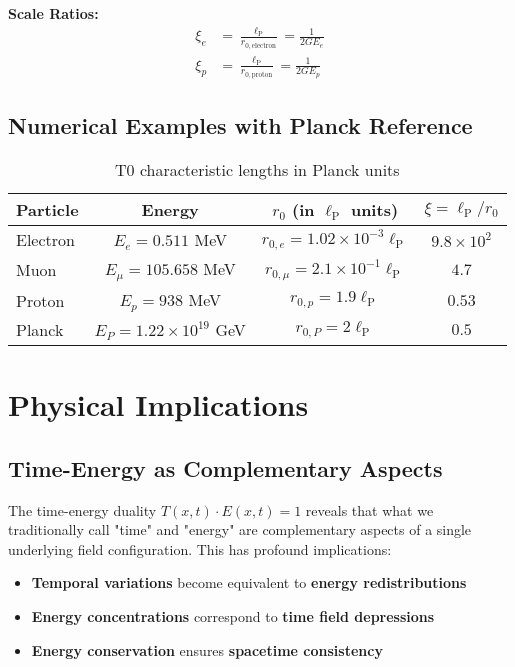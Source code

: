\documentclass[12pt,a4paper]{report}
\newcommand{\lP}{\ell_{\text{P}}}         %
\newcommand{\rzero}{r_0}                  %
\begin{document}
	\textbf{Scale Ratios:}
	\begin{align}
		\xi_{e} &= \frac{\lP}{r_{0,\text{electron}}} = \frac{1}{2GE_e} \\
		\xi_{p} &= \frac{\lP}{r_{0,\text{proton}}} = \frac{1}{2GE_p}
	\end{align}
	
	\subsection{Numerical Examples with Planck Reference}\label{subsec:numerical_examples}
	
	\begin{table}[htbp]
		\centering
		\begin{tabular}{lccc}
			\toprule
			\textbf{Particle} & \textbf{Energy} & \textbf{$\rzero$ (in $\lP$ units)} & \textbf{$\xi = \lP/\rzero$} \\
			\midrule
			Electron & $E_e = 0.511$ MeV & $r_{0,e} = 1.02 \times 10^{-3} \lP$ & $9.8 \times 10^{2}$ \\
			Muon & $E_\mu = 105.658$ MeV & $r_{0,\mu} = 2.1 \times 10^{-1} \lP$ & $4.7$ \\
			Proton & $E_p = 938$ MeV & $r_{0,p} = 1.9 \lP$ & $0.53$ \\
			Planck & $E_P = 1.22 \times 10^{19}$ GeV & $r_{0,P} = 2\lP$ & $0.5$ \\
			\bottomrule
		\end{tabular}
		\caption{T0 characteristic lengths in Planck units}
		\label{tab:t0_scales_planck}
	\end{table}
	
	\section{Physical Implications}\label{sec:physical_implications}
	
	\subsection{Time-Energy as Complementary Aspects}\label{subsec:complementary_aspects}
	
	The time-energy duality $T(x,t) \cdot E(x,t) = 1$ reveals that what we traditionally call "time" and "energy" are complementary aspects of a single underlying field configuration. This has profound implications:
	
	\begin{itemize}
		\item \textbf{Temporal variations} become equivalent to \textbf{energy redistributions}
		\item \textbf{Energy concentrations} correspond to \textbf{time field depressions}
		\item \textbf{Energy conservation} ensures \textbf{spacetime consistency}
	\end{itemize}
	
\end{document}
